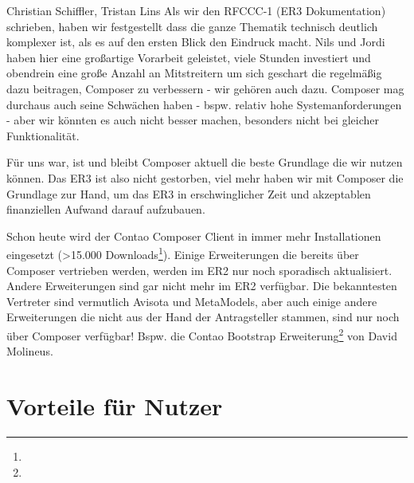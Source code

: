 \documentclass[
paper=a4,
draft=false,%
fontsize=10pt%
]{scrartcl}
\begin{document}
\begin{emquote}{Christian Schiffler, Tristan Lins}
Als wir den RFCCC-1 (ER3 Dokumentation) schrieben, haben wir festgestellt dass die ganze Thematik  technisch deutlich komplexer ist, als es auf den ersten Blick den Eindruck macht. Nils und Jordi haben hier eine großartige Vorarbeit geleistet, viele Stunden investiert und obendrein eine große Anzahl an Mitstreitern um sich geschart die regelmäßig dazu beitragen, Composer zu verbessern - wir gehören auch dazu. Composer mag durchaus auch seine Schwächen haben - bspw. relativ hohe Systemanforderungen - aber wir könnten es auch nicht besser machen, besonders nicht bei gleicher Funktionalität.
\end{emquote}

Für uns war, ist und bleibt Composer aktuell die beste Grundlage die wir nutzen können. Das ER3 ist also nicht gestorben, viel mehr haben wir mit Composer die Grundlage zur Hand, um das ER3 in erschwinglicher Zeit und akzeptablen finanziellen Aufwand darauf aufzubauen.

Schon heute wird der Contao Composer Client in immer mehr Installationen eingesetzt (>15.000 Downloads\footnote{}). Einige Erweiterungen die bereits über Composer vertrieben werden, werden im ER2 nur noch sporadisch aktualisiert. Andere Erweiterungen sind gar nicht mehr im ER2 verfügbar. Die bekanntesten Vertreter sind vermutlich Avisota und MetaModels, aber auch einige andere Erweiterungen die nicht aus der Hand der Antragsteller stammen, sind nur noch über Composer verfügbar! Bspw. die Contao Bootstrap Erweiterung\footnote{} von David Molineus.

\newpage

%
%

\section{Vorteile für Nutzer}
\label{sec:pros-for-users}
\end{document}
